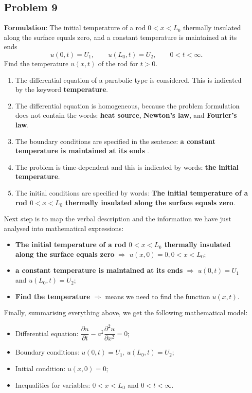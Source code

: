 \subsection{Problem 9}

{\bfseries Formulation}: The initial temperature of a rod $0< x< L_{0}$ thermally insulated along the surface equals zero, and a constant temperature is maintained at its ends 
\begin{equation*}
u(0,t)=U_{1}, \qquad u(L_{0},t)=U_{2}, \qquad 0<t<\infty.
\end{equation*}
Find the temperature $u(x,t)$ of the rod for $t>0$.
\begin{enumerate}
\item The differential equation of a parabolic type is considered. This is indicated by the keyword {\bfseries temperature}.
\item The differential equation is homogeneous, because the problem formulation does not contain the words: {\bfseries heat source}, {\bfseries Newton's law}, and {\bfseries Fourier's law}.
\item The boundary conditions are specified in the sentence: {\bfseries a constant temperature is maintained at its ends }.
\item The problem is time-dependent and this is indicated by words: {\bfseries the initial temperature}.
\item The initial conditions are specified by words: {\bfseries The initial temperature of a rod $0< x< L_{0}$ thermally insulated along the surface equals zero}.
\end{enumerate}
Next step is to map the verbal description and the information we have just analysed into mathematical expressions:
\begin{itemize}
\item {\bfseries The initial temperature of a rod $0< x< L_{0}$ thermally insulated along the surface equals zero} $\Longrightarrow$ $u(x,0)=0, 0<x<L_{0}$;
\item {\bfseries  a constant temperature is maintained at its ends} $\Longrightarrow$ $u(0,t)=U_{1}$ and $u(L_{0},t)=U_{2}$;
\item {\bfseries Find the temperature} $\Longrightarrow$ means we need to find the function $u(x,t)$.
\end{itemize}
Finally, summarising everything above, we get the following mathematical model:
\begin{itemize}
\item Differential equation: $\dfrac{\partial u}{\partial t} - a^{2}\dfrac{\partial^{2} u}{\partial x^{2}}=0$;
\item Boundary conditions: $u(0,t)=U_{1}$, $u(L_{0},t)=U_{2}$;
\item Initial condition: $u(x,0)=0$;
\item Inequalities for variables: $0<x<L_{0}$ and $0<t<\infty$.
\end{itemize}

